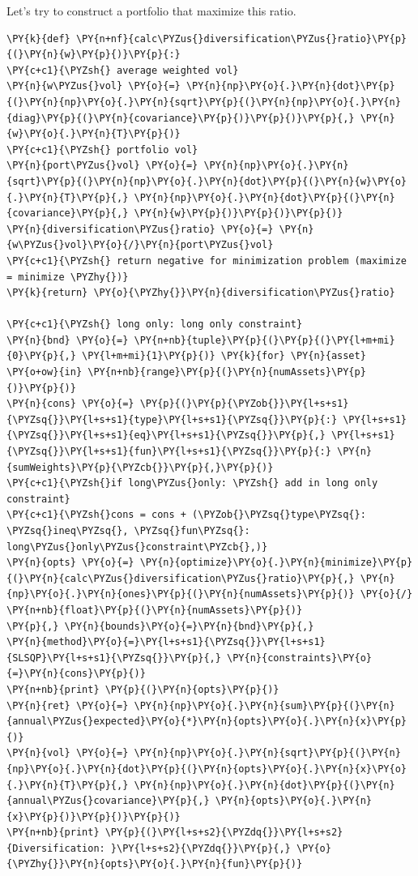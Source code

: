 Let's try to construct a portfolio that maximize this ratio.
\begin{tcolorbox}[breakable, size=fbox, boxrule=1pt, pad at break*=1mm,colback=cellbackground, colframe=cellborder]
\begin{Verbatim}[commandchars=\\\{\}]
\PY{k}{def} \PY{n+nf}{calc\PYZus{}diversification\PYZus{}ratio}\PY{p}{(}\PY{n}{w}\PY{p}{)}\PY{p}{:}
\PY{c+c1}{\PYZsh{} average weighted vol}
\PY{n}{w\PYZus{}vol} \PY{o}{=} \PY{n}{np}\PY{o}{.}\PY{n}{dot}\PY{p}{(}\PY{n}{np}\PY{o}{.}\PY{n}{sqrt}\PY{p}{(}\PY{n}{np}\PY{o}{.}\PY{n}{diag}\PY{p}{(}\PY{n}{covariance}\PY{p}{)}\PY{p}{)}\PY{p}{,} \PY{n}{w}\PY{o}{.}\PY{n}{T}\PY{p}{)}
\PY{c+c1}{\PYZsh{} portfolio vol}
\PY{n}{port\PYZus{}vol} \PY{o}{=} \PY{n}{np}\PY{o}{.}\PY{n}{sqrt}\PY{p}{(}\PY{n}{np}\PY{o}{.}\PY{n}{dot}\PY{p}{(}\PY{n}{w}\PY{o}{.}\PY{n}{T}\PY{p}{,} \PY{n}{np}\PY{o}{.}\PY{n}{dot}\PY{p}{(}\PY{n}{covariance}\PY{p}{,} \PY{n}{w}\PY{p}{)}\PY{p}{)}\PY{p}{)}
\PY{n}{diversification\PYZus{}ratio} \PY{o}{=} \PY{n}{w\PYZus{}vol}\PY{o}{/}\PY{n}{port\PYZus{}vol}
\PY{c+c1}{\PYZsh{} return negative for minimization problem (maximize = minimize \PYZhy{})}
\PY{k}{return} \PY{o}{\PYZhy{}}\PY{n}{diversification\PYZus{}ratio}
		
\PY{c+c1}{\PYZsh{} long only: long only constraint}
\PY{n}{bnd} \PY{o}{=} \PY{n+nb}{tuple}\PY{p}{(}\PY{p}{(}\PY{l+m+mi}{0}\PY{p}{,} \PY{l+m+mi}{1}\PY{p}{)} \PY{k}{for} \PY{n}{asset} \PY{o+ow}{in} \PY{n+nb}{range}\PY{p}{(}\PY{n}{numAssets}\PY{p}{)}\PY{p}{)}
\PY{n}{cons} \PY{o}{=} \PY{p}{(}\PY{p}{\PYZob{}}\PY{l+s+s1}{\PYZsq{}}\PY{l+s+s1}{type}\PY{l+s+s1}{\PYZsq{}}\PY{p}{:} \PY{l+s+s1}{\PYZsq{}}\PY{l+s+s1}{eq}\PY{l+s+s1}{\PYZsq{}}\PY{p}{,} \PY{l+s+s1}{\PYZsq{}}\PY{l+s+s1}{fun}\PY{l+s+s1}{\PYZsq{}}\PY{p}{:} \PY{n}{sumWeights}\PY{p}{\PYZcb{}}\PY{p}{,}\PY{p}{)}
\PY{c+c1}{\PYZsh{}if long\PYZus{}only: \PYZsh{} add in long only constraint}
\PY{c+c1}{\PYZsh{}cons = cons + (\PYZob{}\PYZsq{}type\PYZsq{}: \PYZsq{}ineq\PYZsq{}, \PYZsq{}fun\PYZsq{}:  long\PYZus{}only\PYZus{}constraint\PYZcb{},)}
\PY{n}{opts} \PY{o}{=} \PY{n}{optimize}\PY{o}{.}\PY{n}{minimize}\PY{p}{(}\PY{n}{calc\PYZus{}diversification\PYZus{}ratio}\PY{p}{,} \PY{n}{np}\PY{o}{.}\PY{n}{ones}\PY{p}{(}\PY{n}{numAssets}\PY{p}{)} \PY{o}{/} \PY{n+nb}{float}\PY{p}{(}\PY{n}{numAssets}\PY{p}{)}
\PY{p}{,} \PY{n}{bounds}\PY{o}{=}\PY{n}{bnd}\PY{p}{,} 
\PY{n}{method}\PY{o}{=}\PY{l+s+s1}{\PYZsq{}}\PY{l+s+s1}{SLSQP}\PY{l+s+s1}{\PYZsq{}}\PY{p}{,} \PY{n}{constraints}\PY{o}{=}\PY{n}{cons}\PY{p}{)}
\PY{n+nb}{print} \PY{p}{(}\PY{n}{opts}\PY{p}{)}
\PY{n}{ret} \PY{o}{=} \PY{n}{np}\PY{o}{.}\PY{n}{sum}\PY{p}{(}\PY{n}{annual\PYZus{}expected}\PY{o}{*}\PY{n}{opts}\PY{o}{.}\PY{n}{x}\PY{p}{)}
\PY{n}{vol} \PY{o}{=} \PY{n}{np}\PY{o}{.}\PY{n}{sqrt}\PY{p}{(}\PY{n}{np}\PY{o}{.}\PY{n}{dot}\PY{p}{(}\PY{n}{opts}\PY{o}{.}\PY{n}{x}\PY{o}{.}\PY{n}{T}\PY{p}{,} \PY{n}{np}\PY{o}{.}\PY{n}{dot}\PY{p}{(}\PY{n}{annual\PYZus{}covariance}\PY{p}{,} \PY{n}{opts}\PY{o}{.}\PY{n}{x}\PY{p}{)}\PY{p}{)}\PY{p}{)} 
\PY{n+nb}{print} \PY{p}{(}\PY{l+s+s2}{\PYZdq{}}\PY{l+s+s2}{Diversification: }\PY{l+s+s2}{\PYZdq{}}\PY{p}{,} \PY{o}{\PYZhy{}}\PY{n}{opts}\PY{o}{.}\PY{n}{fun}\PY{p}{)}


\end{Verbatim}
\end{tcolorbox}
